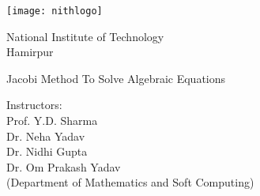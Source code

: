 \documentclass[main.tex]{subfiles}
\begin{document}
    \begin{center}
    \texttt{[image: nithlogo]}

    {\huge National Institute of Technology \\
    Hamirpur \\}

    \vspace{50mm}
    
    {\LARGE Jacobi Method To Solve Algebraic Equations}

    \vspace{35mm}
    Instructors: \\
    \vspace{1mm}
    Prof. Y.D. Sharma\\
    \vspace{1mm}
    Dr. Neha Yadav\\
    \vspace{1mm}
    Dr. Nidhi Gupta\\ 
    \vspace{1mm}
    Dr. Om Prakash Yadav 
    \vspace{2mm}
    \\ (Department of Mathematics and Soft Computing)
    \end{center}
\end{document}
